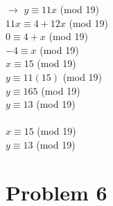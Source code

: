 \documentclass[11pt,letterpaper]{article}
\begin{document}
\begin{enumerate}[(a)]
$\rightarrow$ $y\equiv11x$ (mod 19)\\
$11x\equiv4+12x$ (mod 19)\\
$0\equiv4+x$ (mod 19)\\
$-4\equiv x$ (mod 19)\\
$x\equiv 15$ (mod 19)\\
$y\equiv11(15)$ (mod 19)\\
$y\equiv165$ (mod 19)\\
$y\equiv13$ (mod 19)\\
\\
$x\equiv 15$ (mod 19)\\
$y\equiv13$ (mod 19)\\

\end{enumerate}
\clearpage

\section*{Problem 6}
\end{document}
